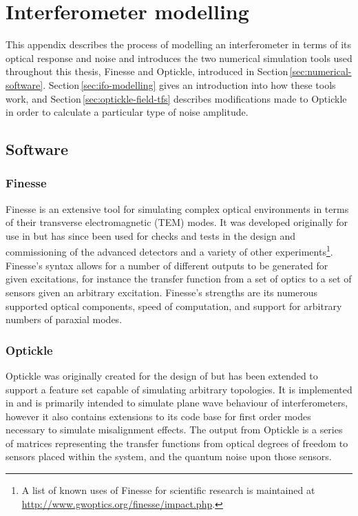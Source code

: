 \chapter{\label{a:simulation-tools}Interferometer modelling}
This appendix describes the process of modelling an interferometer in terms of its optical response and noise and introduces the two numerical simulation tools used throughout this thesis, Finesse and Optickle, introduced in Section\,\ref{sec:numerical-software}. Section\,\ref{sec:ifo-modelling} gives an introduction into how these tools work, and Section\,\ref{sec:optickle-field-tfs} describes modifications made to Optickle in order to calculate a particular type of noise amplitude.

\section{\label{sec:numerical-software}Software}
\subsection{\label{sec:finesse-sim}Finesse}
Finesse is an extensive tool for simulating complex optical environments in terms of their transverse electromagnetic (\gls{TEM}) modes. It was developed originally for use in \GEO{} \cite{Freise2004} but has since been used for checks and tests in the design and commissioning of the advanced detectors \cite{Mueller2015, Kumeta2015} and a variety of other experiments\footnote{A list of known uses of Finesse for scientific research is maintained at \url{http://www.gwoptics.org/finesse/impact.php}.}. Finesse's syntax allows for a number of different outputs to be generated for given excitations, for instance the transfer function from a set of optics to a set of sensors given an arbitrary excitation. Finesse's strengths are its numerous supported optical components, speed of computation, and support for arbitrary numbers of paraxial modes.

\subsection{\label{sec:optickle-sim}Optickle}
Optickle was originally created for the design of \ALIGO{} but has been extended to support a feature set capable of simulating arbitrary topologies. It is implemented in \MATLAB{} and is primarily intended to simulate plane wave behaviour of interferometers, however it also contains extensions to its code base for first order modes necessary to simulate misalignment effects. The output from Optickle is a series of matrices representing the transfer functions from optical degrees of freedom to sensors placed within the system, and the quantum noise upon those sensors.

